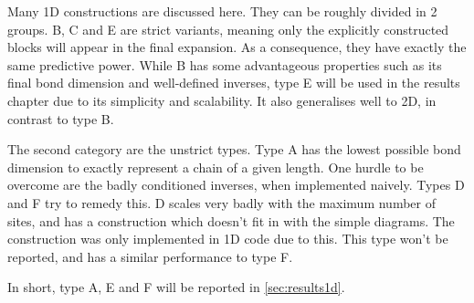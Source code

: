 Many 1D constructions are discussed here. They can be roughly divided in 2 groups. B, C and E are strict variants, meaning only the explicitly constructed blocks will appear in the final expansion. As a consequence, they have exactly the same predictive power. While B has some advantageous properties such as its final bond dimension and well-defined inverses, type E will be used in the results chapter due to its simplicity and scalability. It also generalises well to 2D, in contrast to type B.

The second category are the unstrict types. Type A has the lowest possible bond dimension to exactly represent a chain of a given length. One hurdle to be overcome are the badly conditioned inverses, when implemented naively. Types D and F try to remedy this. D scales very badly with the maximum number of sites, and has a construction which doesn't fit in with the simple diagrams. The construction was only implemented in 1D code due to this. This type won't be reported, and has a similar performance to type F.

In short, type A, E and F will be reported in \cref{sec:results1d}.
